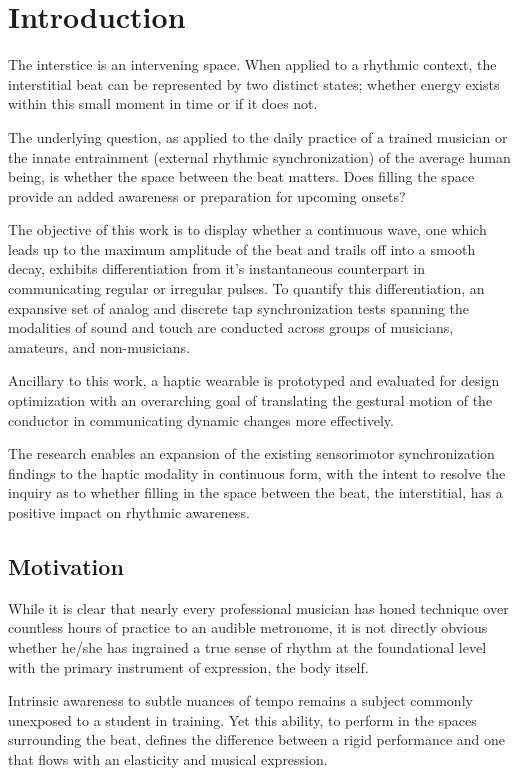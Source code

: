 
\chapter{Introduction} \label{secIntro}
The interstice is an intervening space. When applied to a rhythmic context, the interstitial beat can be represented by two distinct states; whether energy exists within this small moment in time or if it does not. 

The underlying question, as applied to the daily practice of a trained musician or the innate entrainment (external rhythmic synchronization) of the average human being, is whether the space between the beat matters. Does filling the space provide an added awareness or preparation for upcoming onsets?

The objective of this work is to display whether a continuous wave, one which leads up to the maximum amplitude of the beat and trails off into a smooth decay, exhibits differentiation from it's instantaneous counterpart in communicating regular or irregular pulses. To quantify this differentiation, an expansive set of analog and discrete tap synchronization tests spanning the modalities of sound and touch are conducted across groups of musicians, amateurs, and non-musicians.

Ancillary to this work, a haptic wearable is prototyped and evaluated for design optimization with an overarching goal of translating the gestural motion of the conductor in communicating dynamic changes more effectively.

The research enables an expansion of the existing sensorimotor synchronization findings to the haptic modality in continuous form, with the intent to resolve the inquiry as to whether filling in the space between the beat, the interstitial, has a positive impact on rhythmic awareness.

\section{Motivation}
While it is clear that nearly every professional musician has honed technique over countless hours of practice to an audible metronome, it is not directly obvious whether he/she has ingrained a true sense of rhythm at the foundational level with the primary instrument of expression, the body itself.

Intrinsic awareness to subtle nuances of tempo remains a subject commonly unexposed to a student in training. Yet this ability, to perform in the spaces surrounding the beat, defines the difference between a rigid performance and one that flows with an elasticity and musical expression.

